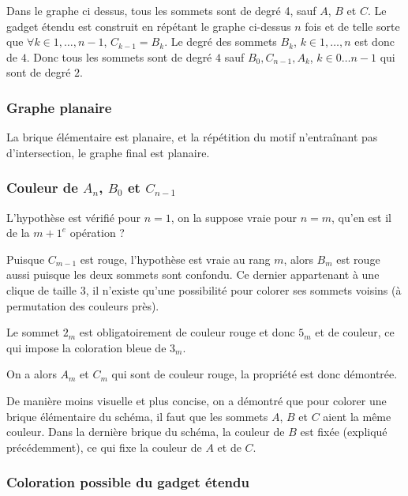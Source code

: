 Dans le graphe ci dessus, tous les sommets sont de degré 4, sauf $A$, $B$ et $C$. Le gadget étendu
est construit en répétant le graphe ci-dessus $n$ fois et de telle sorte que $\forall k \in 1, \dots,
n-1$, $C_{k-1} = B_k$. Le degré des sommets $B_k$, $k \in 1, \dots, n$ est donc de $4$. Donc tous
les sommets sont de degré $4$ sauf $B_0, C_{n-1}, A_k$, $k \in 0 \dots n-1$ qui sont de degré $2$.

\subsubsection{Graphe planaire}

La brique élémentaire est planaire, et la répétition du motif n'entraînant pas d'intersection, le
graphe final est planaire.

\subsubsection{Couleur de $A_n$, $B_0$ et $C_{n-1}$}

L'hypothèse est vérifié pour $n=1$, on la suppose vraie pour $n=m$, qu'en est il de la $m+1^e$
opération ?

Puisque $C_{m-1}$ est rouge, l'hypothèse est vraie au rang $m$, alors $B_m$ est rouge aussi puisque
les deux sommets sont confondu. Ce dernier appartenant à une clique de taille 3, il n'existe qu'une
possibilité pour colorer ses sommets voisins (à permutation des couleurs près).



Le sommet $2_m$ est obligatoirement de couleur rouge et donc $5_m$ et de couleur, ce qui impose la
coloration bleue de $3_m$.



On a alors $A_m$ et $C_m$ qui sont de couleur rouge, la propriété est donc démontrée.



De manière moins visuelle et plus concise, on a démontré que pour colorer une brique élémentaire du
schéma, il faut que les sommets $A$, $B$ et $C$ aient la même couleur. Dans la dernière brique du
schéma, la couleur de $B$ est fixée (expliqué précédemment), ce qui fixe la couleur de $A$ et de
$C$.

\subsubsection{Coloration possible du gadget étendu}


